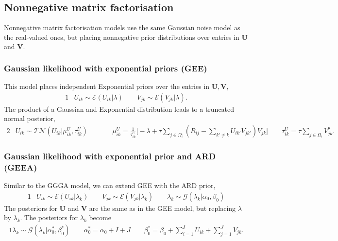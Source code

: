 \documentclass{article}
\newcommand{\U}{\boldsymbol U}
\newcommand{\V}{\boldsymbol V}
\newcommand{\sumOmegai}{\sum_{j \in \Omega_i}}
\newcommand{\sumexclk}{\sum_{k' \neq k}}
\newcommand{\diffexclk}{( R_{ij} - \sumexclk U_{ik'} V_{jk'} ) }
\begin{document}
		\subsection{Nonnegative matrix factorisation}
		Nonnegative matrix factorisation models use the same Gaussian noise model as the real-valued ones, but placing nonnegative prior distributions over entries in $\U$ and $\V$. 
		
		\subsubsection{Gaussian likelihood with exponential priors (GEE)}
		This model places independent Exponential priors over the entries in $\U,\V$,
		\begin{alignat*}{1}
			&U_{ik} \sim \mathcal{E} ( U_{ik} | \lambda )		\quad\quad	V_{jk} \sim \mathcal{E} ( V_{jk} | \lambda ).
		\end{alignat*}
		The product of a Gaussian and Exponential distribution leads to a truncated normal posterior,
		\begin{alignat*}{2}
			& U_{ik} \sim \mathcal{TN} (U_{ik} | \mu^U_{ik}, \tau^U_{ik} )
		\quad\quad &&\mu^U_{ik} = \frac{1}{\tau^U_{ik}} \Bigg[ - \lambda + \tau \sumOmegai \diffexclk V_{jk} \Bigg]
		\quad\quad \tau^U_{ik} = \tau \sumOmegai V_{jk}^2.
		\end{alignat*}
		
		\subsubsection{Gaussian likelihood with exponential prior and ARD (GEEA)}
		Similar to the GGGA model, we can extend GEE with the ARD prior,
		\begin{alignat*}{1}
			&U_{ik} \sim \mathcal{E} ( U_{ik} | \lambda_k )		\quad\quad	V_{jk} \sim \mathcal{E} ( V_{jk} | \lambda_k ) 	\quad\quad 		\lambda_k \sim \mathcal{G} (\lambda_k | \alpha_0, \beta_0 )
		\end{alignat*}
		The posteriors for $\U$ and $\V$ are the same as in the GEE model, but replacing $\lambda$ by $\lambda_k$. The posteriors for $\lambda_k$ become
		\begin{alignat*}{1}
			\lambda_k \sim \mathcal{G} (\lambda_k | \alpha^*_0, \beta^*_0 )		\quad\quad 		\alpha^*_0 = \alpha_0 + I + J 		\quad\quad  		\beta^*_0 = \beta_0 + \sum_{i=1}^I U_{ik} + \sum_{j=1}^J V_{jk}.
		\end{alignat*}
		
\end{document}
